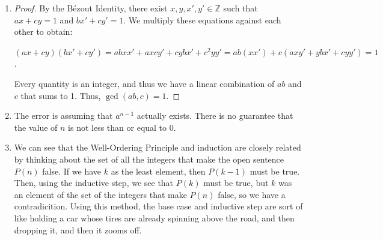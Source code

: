 \documentclass[12pt]{article}
\begin{document}
\begin{enumerate}[start = 1, label = {\bfseries Question \arabic*:}, leftmargin=1in]
\begin{proof}
\begin{itemize}
        we get that $n=(dk)x+(dk')y=d(kx+yk')$. Thus, $n\in d\mathbb{Z}$. So, $S \subseteq d\mathbb{Z}$.
    \end{itemize}
    Thus, we are done.
    \end{proof}
    \item \begin{proof}
    By the Bézout Identity, there exist $x,y,x',y' \in \mathbb{Z}$ such that $ax+cy=1$ and $bx'+cy'=1$. We multiply these equations against each other to obtain:\begin{center}
        $(ax+cy)(bx'+cy')=abxx'+axcy'+cybx'+c^2yy'=ab(xx')+c(axy'+ybx'+cyy')=1$.
    \end{center} Every quantity is an integer, and thus we have a linear combination of $ab$ and $c$ that sums to 1. Thus, $\gcd(ab,c)=1$.
    \end{proof}
        
    \item The error is assuming that $a^{n-1}$ actually exists. There is no guarantee that the value of $n$ is not less than or equal to 0.
    \item We can see that the Well-Ordering Principle and induction are closely related by thinking about the set of all the integers that make the open sentence $P(n)$ false. If we have $k$ as the least element, then $P(k-1)$ must be true. 
    Then, using the inductive step, we see that $P(k)$ must be true, but $k$ was an element of the set of the integers that make $P(n)$ false, so we have a contradicition. Using this method,
    the base case and inductive step are sort of like holding a car whose tires are already spinning above the road, and then dropping it, and then it zooms off.
\end{enumerate}
\end{document}
